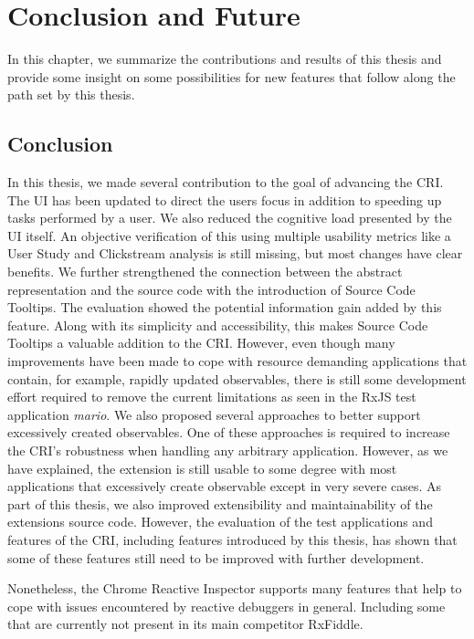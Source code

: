 \chapter{Conclusion and Future}
\label{ch:Future}
In this chapter, we summarize the contributions and results of this thesis and provide some insight on some possibilities for new features that follow along the path set by this thesis. 

\section{Conclusion}
In this thesis, we made several contribution to the goal of advancing the CRI. The UI has been updated to direct the users focus in addition to speeding up tasks performed by a user. We also reduced the cognitive load presented by the UI itself. An objective verification of this using multiple usability metrics like a User Study and Clickstream analysis is still missing, but most changes have clear benefits. We further strengthened the connection between the abstract representation and the source code with the introduction of Source Code Tooltips. The evaluation showed the potential information gain added by this feature. Along with its simplicity and accessibility, this makes Source Code Tooltips a valuable addition to the CRI.
However, even though many improvements have been made to cope with resource demanding applications that contain, for example, rapidly updated observables, there is still some development effort required to remove the current limitations as seen in the RxJS test application \emph{mario}. We also proposed several approaches to better support excessively created observables.
One of these approaches is required to increase the CRI's robustness when handling any arbitrary application. However, as we have explained, the extension is still usable to some degree with most applications that excessively create observable except in very severe cases.
As part of this thesis, we also improved extensibility and maintainability of the extensions source code. However, the evaluation of the test applications and features of the CRI, including features introduced by this thesis, has shown that some of these features still need to be improved with further development.

Nonetheless, the Chrome Reactive Inspector supports many features that help to cope with issues encountered by reactive debuggers in general. Including some that are currently not present in its main competitor RxFiddle.

